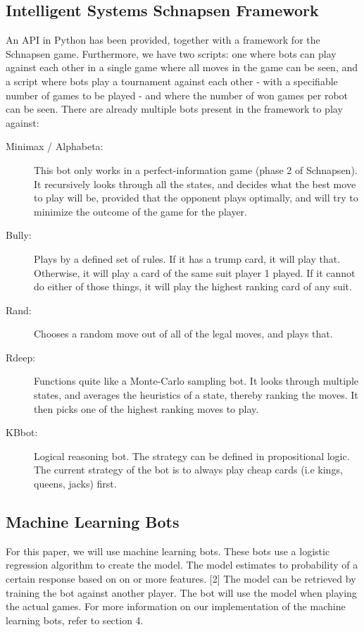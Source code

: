 \documentclass[a4paper,11pt]{article}
\begin{document}
\subsection{Intelligent Systems Schnapsen Framework}
An API in Python has been provided, together with a framework for the Schnapsen game. Furthermore, we  have two scripts: one where bots can play against each other in a single game where all moves in the game can be seen, and a script where bots play a tournament against each other - with a specifiable number of games to be played - and where the number of won games per robot can be seen. There are already multiple bots present in the framework to play against:
\begin{description}
\item [Minimax / Alphabeta:] This bot only works in a perfect-information game (phase 2 of Schnapsen). It recursively looks through all the states, and decides what the best move to play will be, provided that the opponent plays optimally, and will try to minimize the outcome of the game for the player.
\item [Bully:] Plays by a defined set of rules. If it has a trump card, it will play that. Otherwise, it will play a card of the same suit player 1 played. If it cannot do either of those things, it will play the highest ranking card of any suit.
\item [Rand:] Chooses a random move out of all of the legal moves, and plays that.
\item [Rdeep:] Functions quite like a Monte-Carlo sampling bot. It looks through multiple states, and averages the heuristics of a state, thereby ranking the moves. It then picks one of the highest ranking moves to play.
\item [KBbot:] Logical reasoning bot. The strategy can be defined in propositional logic. The current strategy of the bot is to always play cheap cards (i.e kings, queens, jacks) first.
\end{description}

\subsection{Machine Learning Bots}
For this paper, we will use machine learning bots. These bots use a logistic regression algorithm to create the model. The model estimates to probability of a certain response based on on or more features. [2] The model can be retrieved by training the bot against another player. The bot will use the model when playing the actual games. For more information on our implementation of the machine learning bots, refer to section 4.
\end{document}
